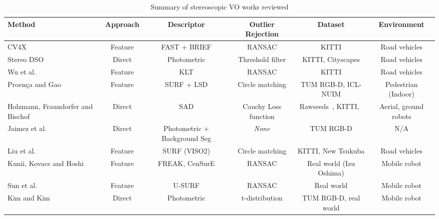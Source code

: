 \begin{table}
 	\caption{Summary of stereoscopic VO works reviewed}\label{tablestereo}
 	\centering
 	\footnotesize
 	\begin{tabularx}{\textwidth}{X c c c c c}
 		\toprule
 		\bfseries Method & \bfseries Approach & \bfseries Descriptor & \bfseries Outlier Rejection & \bfseries Dataset & \bfseries Environment \\
 		\midrule
 		CV4X~\cite{persson_robust_2015} & Feature & FAST + BRIEF & RANSAC & KITTI & Road vehicles\\
 		Stereo DSO~\cite{wang_stereo_2017} & Direct & Photometric & Threshold filter & KITTI, Cityscapes & Road vehicles \\
 		Wu et al.~\cite{wu_framework_2017} & Feature & KLT & RANSAC & KITTI & Road vehicles\\
 		Proen\c{c}a and Gao~\cite{proenca_probabilistic_2018} & Feature & SURF + LSD & Circle matching & TUM RGB-D, ICL-NUIM & Pedestrian (Indoor)\\
 		Holzmann, Fraundorfer and Bischof~\cite{holzmann_detailed_2016} & Direct & SAD & Cauchy Loss function & Rawseeds~\cite{ceriani_rawseeds_2009}, KITTI,~\cite{holzmann_detailed_2016} & Aerial, ground robots\\
 		Jaimez et al.~\cite{jaimez_fast_2017} & Direct & Photometric + Background Seg & \textit{None} & TUM RGB-D & N/A\\
 		Liu et al.~\cite{liu_robust_2017} & Feature & SURF (VISO2) & Circle matching & KITTI, New Tsukuba & Road vehicles\\
 		Kunii, Kovacs and Hoshi~\cite{kunii_mobile_2017} & Feature & FREAK, CenSurE & RANSAC & Real world (Izu Oshima) & Mobile robot\\
 		Sun et al.~\cite{sun_sequentially_2017} & Feature & U-SURF & RANSAC & Real world & Mobile robot \\
 		Kim and Kim~\cite{kim_effective_2016} & Direct & Photometric & t-distribution & TUM RGB-D, real world & Mobile robot \\
 		\bottomrule
 	\end{tabularx}
 \end{table}

